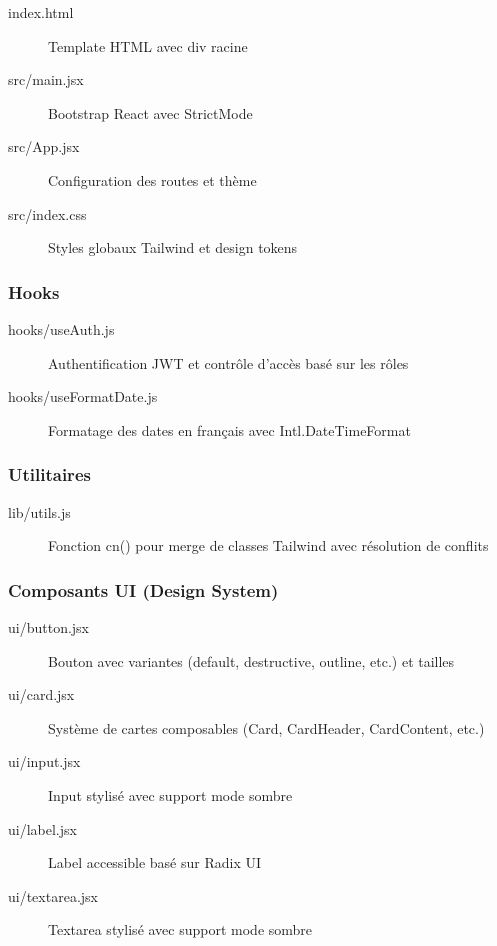 \begin{description}
    \item[index.html] Template HTML avec div racine
    \item[src/main.jsx] Bootstrap React avec StrictMode
    \item[src/App.jsx] Configuration des routes et thème
    \item[src/index.css] Styles globaux Tailwind et design tokens
\end{description}

\subsubsection{Hooks}

\begin{description}
    \item[hooks/useAuth.js] Authentification JWT et contrôle d'accès basé sur les rôles
    \item[hooks/useFormatDate.js] Formatage des dates en français avec Intl.DateTimeFormat
\end{description}

\subsubsection{Utilitaires}

\begin{description}
    \item[lib/utils.js] Fonction cn() pour merge de classes Tailwind avec résolution de conflits
\end{description}

\subsubsection{Composants UI (Design System)}

\begin{description}
    \item[ui/button.jsx] Bouton avec variantes (default, destructive, outline, etc.) et tailles
    \item[ui/card.jsx] Système de cartes composables (Card, CardHeader, CardContent, etc.)
    \item[ui/input.jsx] Input stylisé avec support mode sombre
    \item[ui/label.jsx] Label accessible basé sur Radix UI
    \item[ui/textarea.jsx] Textarea stylisé avec support mode sombre
\end{description}


